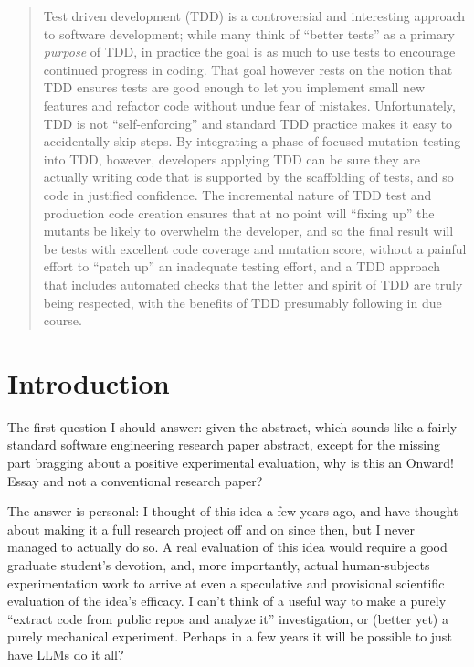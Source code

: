 \documentclass[sigplan,screen]{acmart}
\begin{document}
\begin{abstract}
Test driven development (TDD) is a controversial and interesting approach to
software development; while many think of ``better tests'' as a
primary \emph{purpose} of TDD, in practice the goal is as much to use
tests to encourage continued progress in coding.   That goal however
rests on the notion that TDD ensures tests are good enough to let you
implement small new features and refactor code without undue fear of
mistakes.  Unfortunately, TDD is not ``self-enforcing'' and standard
TDD practice makes it easy to accidentally skip steps.  By integrating
a phase of focused mutation testing into TDD, however, developers
applying TDD can be sure they are actually writing code that is
supported by the scaffolding of tests, and so code in justified confidence.  The incremental nature of TDD
test and production code creation ensures that at no point will
``fixing up'' the mutants be likely to overwhelm the developer, and so
the final result will be tests with excellent code coverage and
mutation score, without a painful effort to ``patch up'' an inadequate
testing effort, and a TDD approach that includes automated checks that
the letter and spirit of TDD are truly being respected, with the
benefits of TDD presumably following in due course.
  \end{abstract}



\maketitle


\section{Introduction}

The first question I should answer: given the abstract, which sounds
like a fairly standard software engineering research paper abstract,
except for the missing part bragging
about a positive experimental evaluation, why is this an Onward! Essay
and not a conventional research paper?

The answer is personal:  I thought of this idea a few years ago, and
have thought about making it a full research project off and on since
then, but I
never managed to actually do so.  A real evaluation of this idea would
require a good graduate student's devotion, and, more importantly,
actual human-subjects experimentation work to arrive at even a
speculative and provisional scientific evaluation of the idea's
efficacy.  I can't think of a useful way to make a purely ``extract
code from public repos and analyze it'' investigation, or (better yet)
a purely mechanical experiment.  Perhaps in a few years it will be
possible to just have LLMs do it all?
\end{document}
